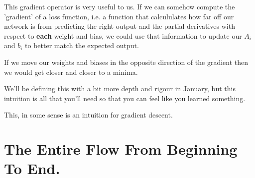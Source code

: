 \documentclass[11pt]{article}
\begin{document}
This gradient operator is very useful to us. If we can somehow compute the 'gradient' of a loss function, i.e. a function that calcululates how far off our network is from predicting the right output and the partial derivatives with respect to \textbf{each} weight and bias, we could use that information to update our \(A_i\) and \(b_i\) to better match the expected output.

If we move our weights and biases in the opposite direction of the gradient then we would get closer and closer to a minima.

We'll be defining this with a bit more depth and rigour in January, but this intuition is all that you'll need so that you can feel like you learned something.

This, in some sense is an intuition for gradient descent.

\section{The Entire Flow From Beginning To End.}

\label{sec:orgd81b1f4}
\end{document}

